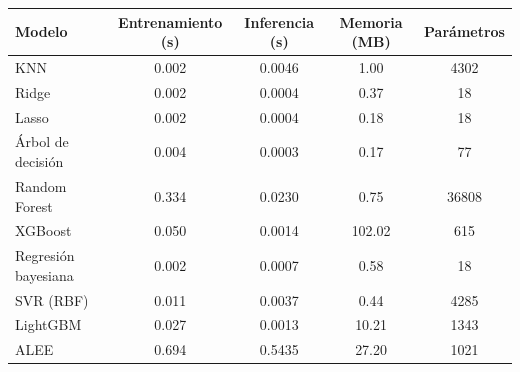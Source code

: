 \begin{tabular}{lcccc}
\toprule
Modelo & Entrenamiento (s) & Inferencia (s) & Memoria (MB) & Parámetros \\
\midrule
KNN & 0.002 & 0.0046 & 1.00 & 4302 \\
Ridge & 0.002 & 0.0004 & 0.37 & 18 \\
Lasso & 0.002 & 0.0004 & 0.18 & 18 \\
Árbol de decisión & 0.004 & 0.0003 & 0.17 & 77 \\
Random Forest & 0.334 & 0.0230 & 0.75 & 36808 \\
XGBoost & 0.050 & 0.0014 & 102.02 & 615 \\
Regresión bayesiana & 0.002 & 0.0007 & 0.58 & 18 \\
SVR (RBF) & 0.011 & 0.0037 & 0.44 & 4285 \\
LightGBM & 0.027 & 0.0013 & 10.21 & 1343 \\
ALEE & 0.694 & 0.5435 & 27.20 & 1021 \\
\bottomrule
\end{tabular}